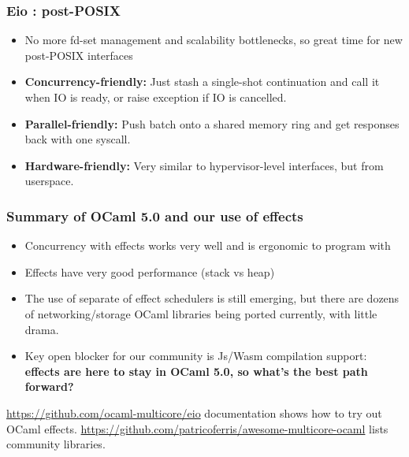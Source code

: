 \documentclass{beamer}
\begin{document}
\begin{frame}
	\frametitle{Eio : post-POSIX}
		\begin{itemize}
      \item No more fd-set management and scalability bottlenecks, so great time for new post-POSIX interfaces
      \item \textbf{Concurrency-friendly:} Just stash a single-shot continuation and call it when IO is ready, or raise exception if IO is cancelled. 
      \item \textbf{Parallel-friendly:} Push batch onto a shared memory ring and get responses back with one syscall.
      \item \textbf{Hardware-friendly:} Very similar to hypervisor-level interfaces, but from userspace.
    \end{itemize}    
\end{frame}

\begin{frame}
	\frametitle{Summary of OCaml 5.0 and our use of effects}
	\begin{itemize}
		\item Concurrency with effects works very well and is ergonomic to program with
		\item Effects have very good performance (stack vs heap)
		\item The use of separate of effect schedulers is still emerging, but there are dozens
		of networking/storage OCaml libraries being ported currently, with little drama.
    \item Key open blocker for our community is Js/Wasm compilation support:
    \textbf{effects are here to stay in OCaml 5.0, so what's the best path forward?}
	\end{itemize}
	\bigskip
	\url{https://github.com/ocaml-multicore/eio} documentation shows how to try out OCaml effects.
  \url{https://github.com/patricoferris/awesome-multicore-ocaml} lists community libraries.
\end{frame}

\end{document}
